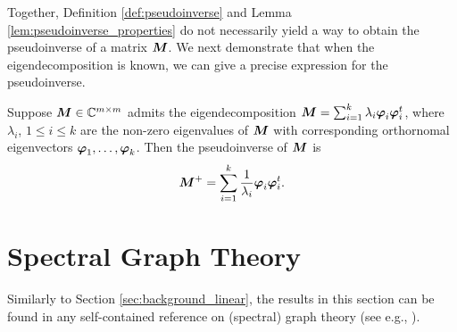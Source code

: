 Together, Definition \ref{def:pseudoinverse} and Lemma \ref{lem:pseudoinverse_properties} do not necessarily yield a way to obtain the pseudoinverse of a matrix ${\vb*{M}}$. We  next demonstrate that when the eigendecomposition is known, we  can give a precise expression for the pseudoinverse. 

\begin{lemma}
\label{lem:pseudoinverse_eigendecomposition}
Suppose ${\vb*{M}}\in\mathbb{C}^{m\times m}$ admits the eigendecomposition 
${\vb*{M}}=\sum_{i=1}^k \lambda_i \vb*{\varphi}_i\vb*{\varphi}_i^t$, 
where $\lambda_i$, $1\leq i\leq k$ are the non-zero eigenvalues of ${\vb*{M}}$ with corresponding orthornomal eigenvectors $\vb*{\varphi}_1,\dots,\vb*{\varphi}_k$. Then the pseudoinverse of ${\vb*{M}}$ is 
\begin{equation}
    \label{eq:pseudoinverse}
    {\vb*{M}}^+=\sum_{i=1}^k \frac{1}{\lambda_i}\vb*{\varphi}_i\vb*{\varphi}_i^t.
\end{equation}
\end{lemma}


\section{Spectral Graph Theory}
\label{sec:background_spectral}

Similarly to  Section \ref{sec:background_linear}, the results in this section can be found in any self-contained reference on (spectral) graph theory (see e.g., \cite{spielman2009spectral,chung1997spectral}).

